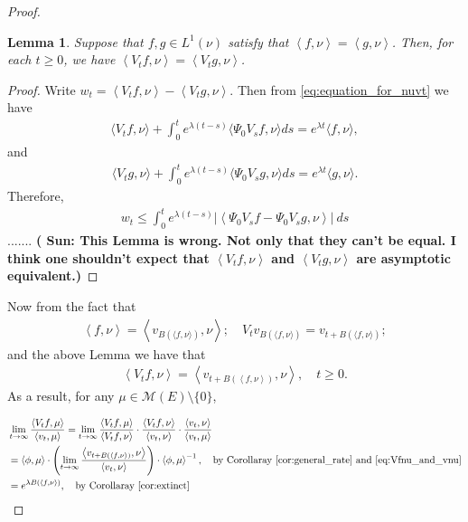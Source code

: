 \documentclass[12pt,a4paper]{amsart}
\numberwithin{equation}{section}
\theoremstyle{plain}
\newtheorem{lem}[thm]{Lemma}
\theoremstyle{definition}
\begin{document}
\begin{proof}
\begin{lem}
\label{lem:wrong}
  Suppose that $f,g\in L^1(\nu)$ satisfy that $\left\langle f,\nu \right\rangle = \left\langle g,\nu \right\rangle$. 
Then, for each $t\geq 0$, we have $ \left\langle V_tf,\nu \right\rangle = \left\langle V_tg,\nu \right\rangle $.
\end{lem}
\begin{proof}
  Write $w_t =\left\langle V_tf,\nu \right\rangle - \left\langle V_t g, \nu \right\rangle $. 
  Then from \eqref{eq:equation_for_nuvt} we have
  \begin{align}
    \langle V_tf,\nu\rangle + \int_0^te^{\lambda(t-s)}\langle \Psi_0V_sf,\nu\rangle ds
=e^{\lambda t}\langle f,\nu\rangle,
  \end{align}
and
  \begin{align}
    \langle V_tg,\nu\rangle + \int_0^te^{\lambda(t-s)}\langle \Psi_0V_sg,\nu\rangle ds
    =e^{\lambda t}\langle g,\nu\rangle .
  \end{align}
Therefore, 
\begin{align}
  w_t \leq \int_0^t e^{\lambda (t-s)} \left | \left\langle \Psi_0 V_s f - \Psi_0 V_s g, \nu \right\rangle \right| ~ds 
\end{align}
.......
{\bf ( Sun: This Lemma is wrong. Not only that they can't be equal. I think one shouldn't expect that $ \left\langle V_tf,\nu \right\rangle$ and $\left\langle V_t g,\nu \right\rangle$ are asymptotic equivalent.)}
\end{proof}
  Now from the fact that 
  \begin{align}
    \left\langle f, \nu \right\rangle
    = \left\langle v_{B(\langle  f,\nu\rangle)},\nu \right\rangle;
\quad 
    V_t v_{B(\langle f,\nu \rangle)} = v_{t+ B(\langle f,\nu\rangle)};
  \end{align}
  and the above Lemma we have that
  \begin{align}
\label{eq:Vfnu_and_vnu}
    \left\langle V_tf,\nu \right\rangle 
    = \left\langle v_{t+B(\left\langle f,\nu \right\rangle)}, \nu \right\rangle,
\quad t\geq 0.
  \end{align}
As a result, for any $\mu\in\mathcal M(E)\setminus\{0\}$,

\begin{align}
  &\lim_{t\to \infty}\frac{\left\langle V_tf, \mu \right\rangle}{\left\langle v_t,\mu \right\rangle}
  = \lim_{t\to \infty} \frac{\left\langle V_tf,\mu \right\rangle}{\left\langle V_tf,\nu \right\rangle} \cdot \frac{\left\langle V_tf,\nu \right\rangle}{\left\langle v_t,\nu \right\rangle} \cdot \frac{\left\langle v_t,\nu \right\rangle}{\left\langle v_t,\mu \right\rangle}
  \\&= \left\langle \phi,\mu \right\rangle \cdot \left(\lim_{t\to \infty}\frac{\left\langle v_{t+B(\left\langle f,\nu \right\rangle)}, \nu \right\rangle}{ \left\langle v_t,\nu \right\rangle}\right) \cdot \left\langle \phi,\mu \right\rangle^{-1},\quad\text{by~Corollaray \ref{cor:general_rate} and \eqref{eq:Vfnu_and_vnu}}
  \\& = e^{\lambda B(\left\langle f, \nu \right\rangle)},\quad\text{by~Corollaray \ref{cor:extinct}}
\end{align}
\end{proof}
\end{document}
